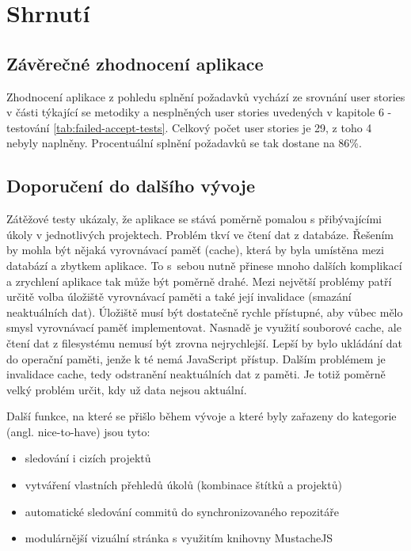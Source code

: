 \chapter{Shrnutí}

\section{Závěrečné zhodnocení aplikace}

Zhodnocení aplikace z pohledu splnění požadavků vychází ze srovnání user stories v části týkající se metodiky a nesplněných user stories uvedených v kapitole 6 - testování \ref{tab:failed-accept-tests}. Celkový počet user stories je 29, z toho 4 nebyly naplněny. Procentuální splnění požadavků se tak dostane na 86\%.

\section{Doporučení do dalšího vývoje}

Zátěžové testy ukázaly, že aplikace se stává poměrně pomalou s přibývajícími úkoly v jednotlivých projektech. Problém tkví ve čtení dat z databáze. Řešením by mohla být nějaká vyrovnávací paměť (cache), která by byla umístěna mezi databází a zbytkem aplikace. To s~sebou nutně přinese mnoho dalších komplikací a zrychlení aplikace tak může být poměrně drahé. Mezi největší problémy patří určitě volba úložiště vyrovnávací paměti a také její invalidace (smazání neaktuálních dat). Úložiště musí být dostatečně rychle přístupné, aby vůbec mělo smysl vyrovnávací paměť implementovat. Nasnadě je využití souborové cache, ale čtení dat z filesystému nemusí být zrovna nejrychlejší. Lepší by bylo ukládání dat do operační paměti, jenže k té nemá JavaScript přístup. Dalším problémem je invalidace cache, tedy odstranění neaktuálních dat z paměti. Je totiž poměrně velký problém určit, kdy už data nejsou aktuální.

Další funkce, na které se přišlo během vývoje a které byly zařazeny do kategorie  (angl. nice-to-have) jsou tyto:

\begin{itemize}
\item sledování i cizích projektů
\item vytváření vlastních přehledů úkolů (kombinace štítků a projektů)
\item automatické sledování commitů do synchronizovaného repozitáře
\item modulárnější vizuální stránka s využitím knihovny MustacheJS\cite{mustache}
\end{itemize}

